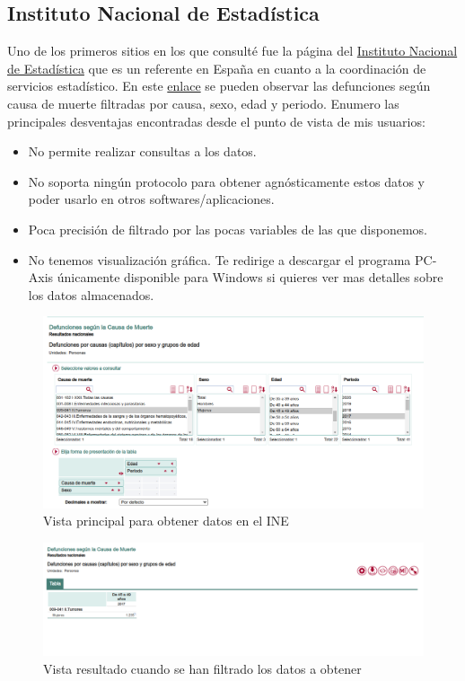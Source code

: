 \subsection{Instituto Nacional de Estadística}
Uno de los primeros sitios en los que consulté fue la página del \href{https://www.ine.es/index.htm}{Instituto Nacional de Estadística} que es un referente en España en cuanto a la coordinación de servicios estadístico.
En este \href{https://www.ine.es/jaxiT3/Tabla.htm?t=6609}{enlace} se pueden observar las defunciones según causa de muerte filtradas por causa, sexo, edad y periodo. 
Enumero las principales desventajas encontradas desde el punto de vista de mis usuarios:
\begin{itemize}
    \item No permite realizar consultas a los datos.
    \item No soporta ningún protocolo para obtener agnósticamente estos datos y poder usarlo en otros softwares/aplicaciones.
    \item Poca precisión de filtrado por las pocas variables de las que disponemos.
    \item No tenemos visualización gráfica. Te redirige a descargar el programa PC-Axis únicamente disponible para Windows si quieres ver mas detalles sobre los datos almacenados.
\end{itemize}
\FloatBarrier
\begin{figure}[]
	\centering
	\includegraphics[scale=0.5]{doc/logos/imgs/ine1.png}
	\caption{  Vista principal para obtener datos en el INE }
    \label{fig:worst_f_value}
\end{figure}

\begin{figure}[]
	\centering
	\includegraphics[scale=0.5]{doc/logos/imgs/ine2.png}
	\caption{ Vista resultado cuando se han filtrado los datos a obtener }
    \label{fig:worst_f_value}
\end{figure}
\FloatBarrier

